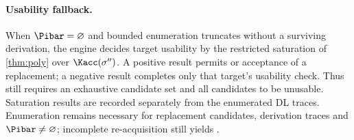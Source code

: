 \paragraph{Usability fallback.}
When $\Pibar=\varnothing$ and bounded enumeration truncates without a surviving derivation, the engine decides target usability by the restricted saturation of \cref{thm:poly} over $\Kacc(\sigma'')$. A positive result permits \preserve{} or acceptance of a replacement; a negative result completes only that target's usability check. Thus \skipm{} still requires an exhaustive candidate set and all candidates to be unusable. Saturation results are recorded separately from the enumerated DL traces. Enumeration remains necessary for replacement candidates, derivation traces and $\Pibar\neq\varnothing$; incomplete re-acquisition still yields \unknowncov{}.
